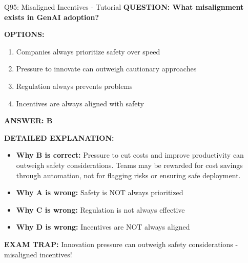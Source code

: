 \documentclass[8pt]{beamer}
\begin{document}
	\begin{frame}{Q95: Misaligned Incentives - Tutorial}
		\fontsize{6.5}{7.5}\selectfont
		\textbf{QUESTION: What misalignment exists in GenAI adoption?}
		
		\vspace{0.1cm}
		\textbf{OPTIONS:}
		\begin{enumerate}
			\item Companies always prioritize safety over speed
			\item Pressure to innovate can outweigh cautionary approaches
			\item Regulation always prevents problems
			\item Incentives are always aligned with safety
		\end{enumerate}
		
		\vspace{0.1cm}
		\textcolor{myblue}{\textbf{ANSWER: B}}
		
		\vspace{0.1cm}
		\textbf{DETAILED EXPLANATION:}
		\begin{itemize}
			\item \textbf{Why B is correct:} Pressure to cut costs and improve productivity can outweigh safety considerations. Teams may be rewarded for cost savings through automation, not for flagging risks or ensuring safe deployment.
			\item \textbf{Why A is wrong:} Safety is NOT always prioritized
			\item \textbf{Why C is wrong:} Regulation is not always effective
			\item \textbf{Why D is wrong:} Incentives are NOT always aligned
		\end{itemize}
		
		\textcolor{myred}{\textbf{EXAM TRAP:}} Innovation pressure can \textcolor{myblue}{outweigh safety considerations} - misaligned incentives!
	\end{frame}
	
\end{document}
